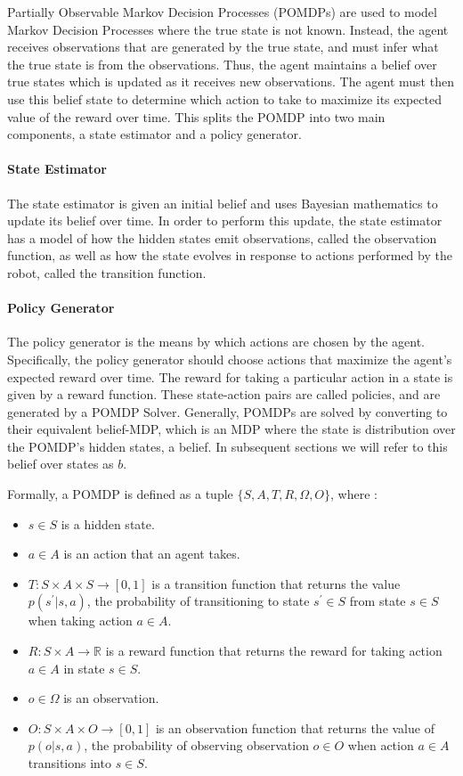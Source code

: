 \documentclass{article}
\begin{document}
\begin{multicols}{2}
Partially Observable Markov Decision Processes (POMDPs) are used to model Markov Decision Processes where the true state is not known. Instead, the agent receives observations that are generated by the true state, and must infer what the true state is from the observations. Thus, the agent maintains a belief over true states which is updated as it receives new observations. The agent must then use this belief state to determine which action to take to maximize its expected value of the reward over time. This splits the POMDP into two main components, a state estimator and a policy generator. 

\paragraph{State Estimator}

The state estimator is given an initial belief and uses Bayesian mathematics to update its belief over time. In order to perform this update, the state estimator has a model of how the hidden states emit observations, called the observation function, as well as how the state evolves in response to actions performed by the robot, called the transition function. 

\paragraph{Policy Generator}

The policy generator is the means by which actions are chosen by the agent. Specifically, the policy generator should choose actions that maximize the agent's expected reward over time. The reward for taking a particular action in a state is given by a reward function. These state-action pairs are called policies, and are generated by a POMDP Solver. Generally, POMDPs are solved by converting to their equivalent belief-MDP, which is an MDP where the state is distribution over the POMDP's hidden states, a belief. In subsequent sections we will refer to this belief over states as $b$. 


Formally, a POMDP is defined as a tuple $\{S, A, T, R, \Omega, O\}$, where : 
\begin{itemize}
	\item $s \in S$ is a hidden state. 
	\item $a \in A$ is an action that an agent takes. 
	\item $T: S \times A \times S \to [0, 1]$ is a transition function that returns the value $p(s^\prime | s, a)$, the probability of transitioning to state $s^\prime \in  S$ from state $s \in S$ when taking action $a \in A$. 
	\item $R: S \times A \to \mathbb{R}$ is a reward function that returns the reward for taking action $a \in A$ in state $s \in S$. 
	\item $o \in \Omega$ is an observation. 
	\item $O: S \times A \times O \to [0, 1]$ is an observation function that returns the value of $p(o | s, a)$, the probability of observing observation $o \in O$ when action $a \in A$ transitions into $s \in S$. 
\end{itemize}


\end{multicols}
\end{document}
